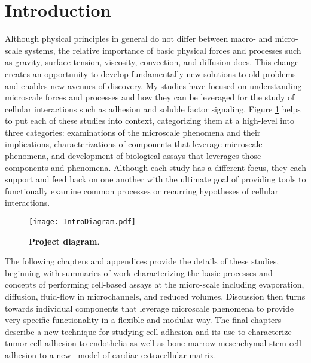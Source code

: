 \chapter*{Introduction} %
\label{Introduction}
Although physical principles in general do not differ between macro- and micro-scale systems, the relative importance of basic physical forces and processes such as gravity, surface-tension, viscosity, convection, and diffusion does. This change creates an opportunity to develop fundamentally new solutions to old problems and enables new avenues of discovery. My studies have focused on understanding microscale forces and processes and how they can be leveraged for the study of cellular interactions such as adhesion and soluble factor signaling. Figure \ref{Chap:Introduction:fig:relationships} helps to put each of these studies into context, categorizing them at a high-level into three categories: examinations of the microscale phenomena and their implications, characterizations of components that leverage microscale phenomena, and development of biological assays that leverages those components and phenomena. Although each study has a different focus, they each support and feed back on one another with the ultimate goal of providing tools to functionally examine common processes or recurring hypotheses of cellular interactions.
\begin{figure}[!ht]
\centering
\texttt{[image: IntroDiagram.pdf]}
\caption{\textbf{Project diagram}.}
\label{Chap:Introduction:fig:relationships}
\end{figure}

The following chapters and appendices provide the details of these studies, beginning with summaries of work characterizing the basic processes and concepts of performing cell-based assays at the micro-scale including evaporation, diffusion, fluid-flow in microchannels, and reduced volumes. Discussion then turns towards individual components that leverage microscale phenomena to provide very specific functionality in a flexible and modular way. The final chapters describe a new technique for studying cell adhesion and its use to characterize tumor-cell adhesion to endothelia as well as bone marrow mesenchymal stem-cell adhesion to a new \invitro\ model of cardiac extracellular matrix.
